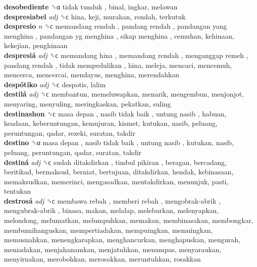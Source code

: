 \textbf{desobediente} ␝α   tidak tunduk , binal, ingkar, melawan  \\
\textbf{despresiabel} \emph{adj}  ␝ϲ  hina, keji, murahan, rendah, terkutuk  \\
\textbf{despresio} \emph{n}  ␝ϲ   memandang rendah ,  pandang rendah ,  pandangan yang menghina ,  pandangan yg menghina ,  sikap menghina , cemuhan, kehinaan, kekejian, penghinaan  \\
\textbf{despresiá} \emph{adj}  ␝ϲ   memandang hina ,  memandang rendah ,  menganggap remeh ,  pandang rendah ,  tidak mempedulikan , hina, meleja, mencaci, mencemuh, mencerca, mencercai, mendayus, menghina, merendahkan  \\
\textbf{despótiko} \emph{adj}  ␝ϲ  despotis, lalim  \\
\textbf{destilá} \emph{adj}  ␝ϲ  membantun, memeluwapkan, menarik, mengembun, menjonjot, menyaring, menyuling, meringkaskan, pekatkan, suling  \\
\textbf{destinashon} ␝ϲ   masa depan ,  nasib tidak baik ,  untung nasib , habuan, keadaan, keberuntungan, kemujuran, kismet, kutukan, nasib, peluang, peruntungan, qadar, rezeki, suratan, takdir  \\
\textbf{destino} ␝α   masa depan ,  nasib tidak baik ,  untung nasib , kutukan, nasib, peluang, peruntungan, qadar, suratan, takdir  \\
\textbf{destiná} \emph{adj}  ␝ϲ   sudah ditakdirkan ,  timbul pikiran , beragan, bercadang, beritikad, bermaksud, berniat, bertujuan, ditakdirkan, hendak, kebinasaan, memaksudkan, memerinci, mengasadkan, mentakdirkan, menunjuk, pasti, tentukan  \\
\textbf{destrosá} \emph{adj}  ␝ϲ   membawa rebah ,  memberi rebah ,  mengobrak-abrik ,  mengubrak-abrik , binasa, makan, melalap, meleburkan, melenyapkan, melondong, melumatkan, melumpuhkan, memakan, membinasakan, membongkar, membumihanguskan, mempertiadakan, mempuingkan, memuingkan, memusnahkan, menengkarapkan, menghancurkan, menghapuskan, mengurah, meniadakan, menjahanamkan, menjatuhkan, menumpas, menyaraukan, menyirnakan, merobohkan, merosakkan, meruntuhkan, rosakkan  \\
